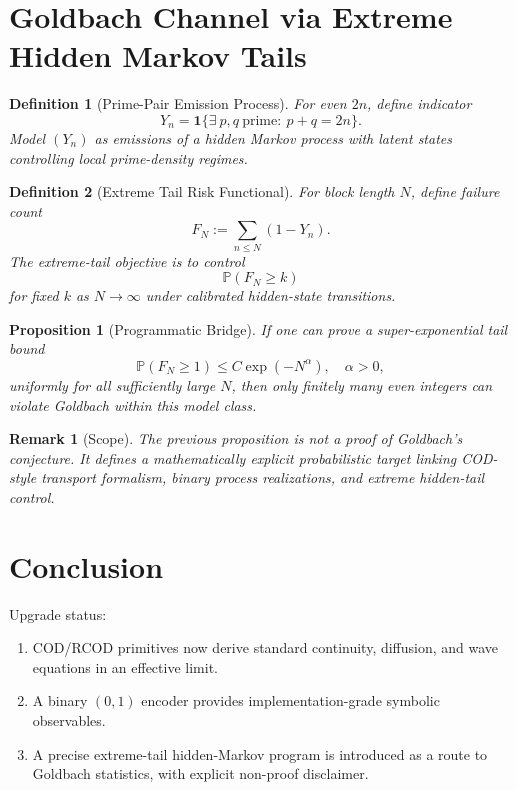 \documentclass[11pt, a4paper]{article}
\newtheorem{definition}{Definition}
\newtheorem{proposition}{Proposition}
\newtheorem{remark}{Remark}
\begin{document}
\section{Goldbach Channel via Extreme Hidden Markov Tails}

\begin{definition}[Prime-Pair Emission Process]
For even $2n$, define indicator
\begin{equation}
Y_n = \mathbf{1}\{\exists\ p,q\ \text{prime}:\ p+q=2n\}.
\end{equation}
Model $(Y_n)$ as emissions of a hidden Markov process with latent states controlling local prime-density regimes.
\end{definition}

\begin{definition}[Extreme Tail Risk Functional]
For block length $N$, define failure count
\begin{equation}
F_N := \sum_{n\le N}(1-Y_n).
\end{equation}
The extreme-tail objective is to control
\begin{equation}
\mathbb{P}(F_N\ge k)
\end{equation}
for fixed $k$ as $N\to\infty$ under calibrated hidden-state transitions.
\end{definition}

\begin{proposition}[Programmatic Bridge]
If one can prove a super-exponential tail bound
\begin{equation}
\mathbb{P}(F_N\ge 1) \le C\exp(-N^\alpha),\quad \alpha>0,
\end{equation}
uniformly for all sufficiently large $N$, then only finitely many even integers can violate Goldbach within this model class.
\end{proposition}

\begin{remark}[Scope]
The previous proposition is not a proof of Goldbach's conjecture. It defines a mathematically explicit probabilistic target linking COD-style transport formalism, binary process realizations, and extreme hidden-tail control.
\end{remark}

\section{Conclusion}
Upgrade status:
\begin{enumerate}
    \item COD/RCOD primitives now derive standard continuity, diffusion, and wave equations in an effective limit.
    \item A binary $(0,1)$ encoder provides implementation-grade symbolic observables.
    \item A precise extreme-tail hidden-Markov program is introduced as a route to Goldbach statistics, with explicit non-proof disclaimer.
\end{enumerate}
\end{document}
